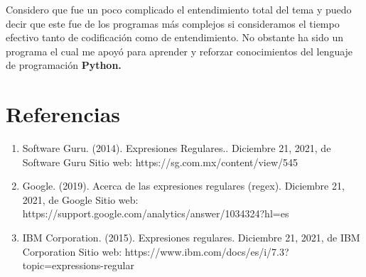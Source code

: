 \documentclass{article}
\begin{document}
 	Considero que fue un poco complicado el entendimiento total del tema y puedo decir que este fue de los programas más complejos si consideramos el tiempo efectivo tanto de codificación como de entendimiento. 	
 	No obstante ha sido  un programa el cual me apoyó para aprender y reforzar conocimientos del lenguaje de programación \textbf{Python.}
	\section*{Referencias}
	\begin{enumerate}
		\item Software Guru. (2014). Expresiones Regulares.. Diciembre 21, 2021, de Software Guru Sitio web: https://sg.com.mx/content/view/545
		\item Google. (2019). Acerca de las expresiones regulares (regex). Diciembre 21, 2021, de Google Sitio web: https://support.google.com/analytics/answer/1034324?hl=es
		\item IBM Corporation. (2015). Expresiones regulares. Diciembre 21, 2021, de IBM Corporation Sitio web: https://www.ibm.com/docs/es/i/7.3?topic=expressions-regular
		
	\end{enumerate}
\end{document}
